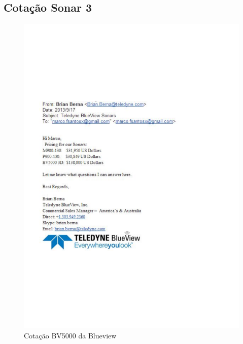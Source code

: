 \subsection{Cotação Sonar 3 }
\begin{figure}[H]
 \centering
 \includegraphics[width=1\columnwidth]{Seaking_profiler/price_quote_2.pdf}
 \caption{Cotação BV5000 da Blueview}
\end{figure}


